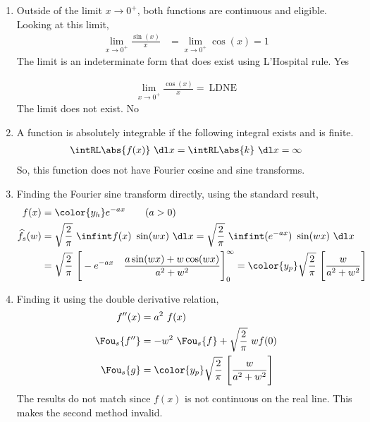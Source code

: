 \begin{enumerate}
    \item Outside of the limit $ x \to 0^+ $, both functions are
          continuous and eligible. Looking at this limit,
          \begin{align}
              \lim_{x \to 0^+} \frac{\sin(x)}{x} & =
              \lim_{x \to 0^+} \cos(x) = 1
          \end{align}
          The limit is an indeterminate form that does exist using L'Hospital rule.
          \textcolor{y_h}{Yes}

          \begin{align}
              \lim_{x \to 0^+} \frac{\cos(x)}{x} =\ \text{LDNE}
          \end{align}
          The limit does not exist. \textcolor{y_p}{No}

    \item A function is absolutely integrable if the following integral exists
          and is finite.
          \begin{align}
              \intRL \abs{f(x)}\ \dl x = \intRL \abs{k}\ \dl x = \infty
          \end{align}
          So, this function does not have Fourier cosine and sine transforms.

    \item Finding the Fourier sine transform directly, using the standard result,
          \begin{align}
              f(x)             & = \color{y_h} e^{-ax} \qquad (a>0)                    \\
              \widehat{f}_s(w) & = \sqrt{\frac{2}{\pi}}\ \infint f(x)\ \sin(wx)\ \dl x
              = \sqrt{\frac{2}{\pi}}\ \infint (e^{-ax})\ \sin(wx)\ \dl x               \\
                               & = \sqrt{\frac{2}{\pi}}\ \Bigg[ -e^{-ax}\quad
              \frac{a \sin(wx) + w \cos(wx)}{a^2 + w^2} \Bigg]_0^\infty
              = \color{y_p} \sqrt{\frac{2}{\pi}}\ \Bigg[ \frac{w}{a^2 + w^2} \Bigg]
          \end{align}

    \item Finding it using the double derivative relation,
          \begin{align}
              f''(x)        & = a^2\ f(x)                                       \\
              \Fou_s\{f''\} & = -w^2\ \Fou_s\{f\} + \sqrt{\frac{2}{\pi}}\ wf(0) \\
              \Fou_s \{g\}  & = \color{y_p}
              \sqrt{\frac{2}{\pi}}\ \Bigg[\frac{w}{a^2 + w^2}\Bigg]
          \end{align}
          The results do not match since $ f(x) $ is not continuous on the real line.
          This makes the second method invalid.


\end{enumerate}
